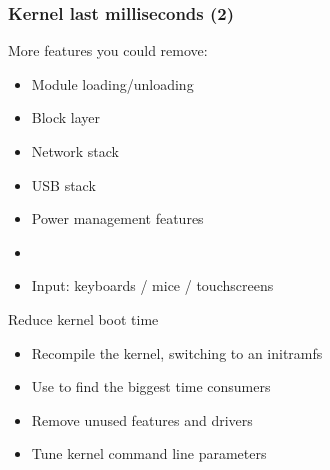 \begin{frame}
\frametitle{Kernel last milliseconds (2)}
More features you could remove:
\begin{itemize}
        \item Module loading/unloading
        \item Block layer
        \item Network stack
        \item USB stack
        \item Power management features
        \item {}
        \item Input: keyboards / mice / touchscreens
\end{itemize}
\end{frame}

\setuplabframe
{Reduce kernel boot time}
{
\begin{itemize}
\item Recompile the kernel, switching to an initramfs
\item Use  to find the biggest
      time consumers
\item Remove unused features and drivers
\item Tune kernel command line parameters
\end{itemize}
}

